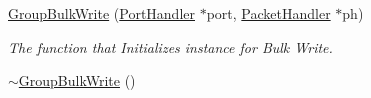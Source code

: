 \begin{DoxyCompactItemize}
\item 
\hyperlink{classmercury_1_1_group_bulk_write_a360c267f9500e096a4f3544cc856004d}{Group\+Bulk\+Write} (\hyperlink{classmercury_1_1_port_handler}{Port\+Handler} $\ast$port, \hyperlink{classmercury_1_1_packet_handler}{Packet\+Handler} $\ast$ph)
\begin{DoxyCompactList}\small\item\em The function that Initializes instance for Bulk Write. \end{DoxyCompactList}\item 
\hyperlink{classmercury_1_1_group_bulk_write_a8c5eda151b931f420d51fd9a98c40cff}{$\sim$\+Group\+Bulk\+Write} ()\hypertarget{classmercury_1_1_group_bulk_write_a8c5eda151b931f420d51fd9a98c40cff}{}\label{classmercury_1_1_group_bulk_write_a8c5eda151b931f420d51fd9a98c40cff}


\end{DoxyCompactItemize}
